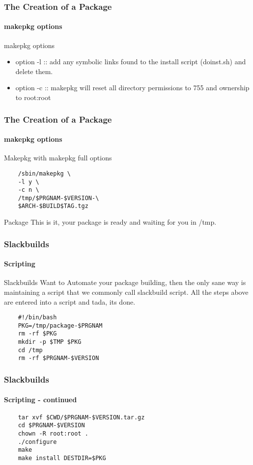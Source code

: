 \documentclass[12pt,hyperref={pdfpagelabels=true}]{beamer}
\begin{document}
\begin{frame}
  \frametitle{The Creation of a Package}
  \framesubtitle{makepkg options}
  \begin{example}{makepkg options}
    \begin{itemize}[<+-| alert@+>]
    \item option -l :: add any symbolic links found to the install script
      (doinst.sh) and delete them.
    \item option -c :: makepkg will reset all directory permissions to 755 and
      ownership to root:root
    \end{itemize}
  \end{example}
\end{frame}

\begin{frame}[fragile]
  \frametitle{The Creation of a Package}
  \framesubtitle{makepkg options}
  \begin{block}{Makepkg}
    with makepkg full options
  \end{block}
  
  \begin{lstlisting}
    /sbin/makepkg \
    -l y \
    -c n \
    /tmp/$PRGNAM-$VERSION-\
    $ARCH-$BUILD$TAG.tgz
  \end{lstlisting}
  
  \pause

  \begin{block}{Package}
    This is it, your package is ready and waiting for you in /tmp.
  \end{block}
\end{frame}


\begin{frame}[fragile]
  \frametitle{Slackbuilds}
  \framesubtitle{Scripting}
  \begin{block}{Slackbuilds}
    Want to Automate your package building, then the only sane way is
    maintaining a script that we commonly call slackbuild script.
    All the steps above are entered into a script and tada, its done.
  \end{block}

  \pause

  \begin{lstlisting}
    #!/bin/bash
    PKG=/tmp/package-$PRGNAM
    rm -rf $PKG
    mkdir -p $TMP $PKG
    cd /tmp
    rm -rf $PRGNAM-$VERSION
  \end{lstlisting}
\end{frame}

\begin{frame}[fragile]
  \frametitle{Slackbuilds}
  \framesubtitle{Scripting - continued}

  \begin{lstlisting}
    tar xvf $CWD/$PRGNAM-$VERSION.tar.gz
    cd $PRGNAM-$VERSION
    chown -R root:root .
    ./configure
    make
    make install DESTDIR=$PKG
  \end{lstlisting}
\end{frame}
\end{document}

